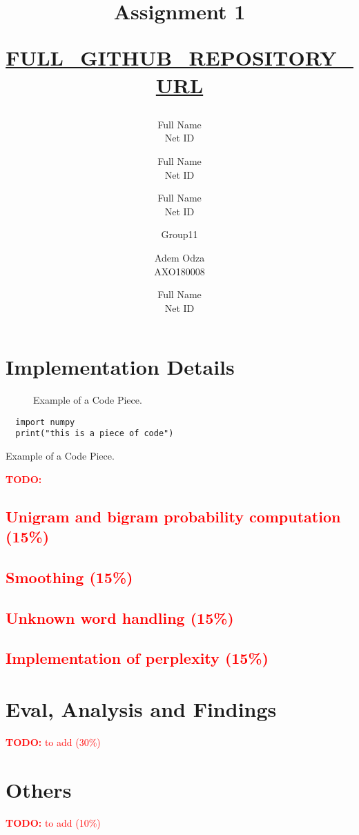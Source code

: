 \documentclass[a4paper]{article}
\title{Assignment 1 \\ \begin{small}\url{FULL_GITHUB_REPOSITORY_URL}\end{small}}
\author{Full Name \\ Net ID \and Full Name \\ Net ID \and Full Name \\ Net ID}
\author{Group11 \and  Adem Odza \\ AXO180008  \and Full Name \\ Net ID}
\date{}
\newcommand{\todo}[1]{\textcolor{red}{\textbf{TODO:} #1}}
\begin{document}
\maketitle



\section{Implementation Details}
% 
\begin{figure}[h]
\centering
\small
{}
\caption{Example of a Code Piece.}
\label{fig:eg}
\end{figure}


\begin{listing}[ht]
\begin{verbatim}
  import numpy  
  print("this is a piece of code")
\end{verbatim}
\caption{Example of a Code Piece.}
\label{lst:eg}
\end{listing}

\todo{
    \subsection{Unigram and bigram probability computation (15\%)}
    \subsection{Smoothing (15\%)}
    \subsection{Unknown word handling (15\%)}
    \subsection{Implementation of perplexity (15\%)}
}


\section{Eval, Analysis and Findings}
\todo{to add (30\%)}


\section{Others}
\todo{to add (10\%)}

 
\end{document}
